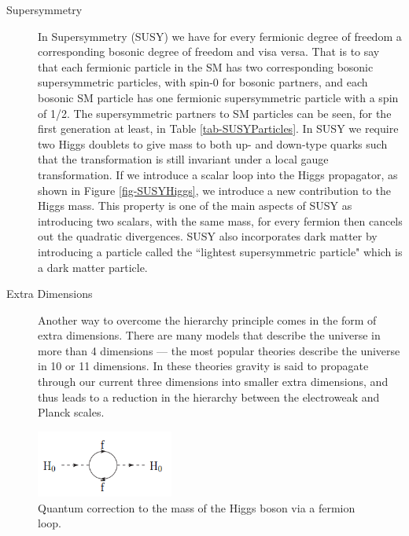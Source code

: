 \begin{description}
	\item[Supersymmetry] In Supersymmetry (SUSY) we have for every fermionic degree of freedom a corresponding bosonic degree of freedom and visa versa. That is to say that each fermionic particle in the SM has two corresponding bosonic supersymmetric particles, with spin-0 for bosonic partners, and each bosonic SM particle has one fermionic supersymmetric particle with a spin of 1/2. The supersymmetric partners to SM particles can be seen, for the first generation at least, in Table \ref{tab-SUSYParticles}. In SUSY we require two Higgs doublets to give mass to both up- and down-type quarks such that the transformation is still invariant under a local gauge transformation. If we introduce a scalar loop into the Higgs propagator, as shown in Figure \ref{fig-SUSYHiggs}, we introduce a new contribution to the Higgs mass. This property is one of the main aspects of SUSY as introducing two scalars, with the same mass, for every fermion then cancels out the quadratic divergences. SUSY also incorporates dark matter by introducing a particle called the ``lightest supersymmetric particle" which is a dark matter particle. 
	\item[Extra Dimensions] Another way to overcome the hierarchy principle comes in the form of extra dimensions. There are many models that describe the universe in more than 4 dimensions --- the most popular theories describe the universe in 10 or 11 dimensions. In these theories gravity is said to propagate through our current three dimensions into smaller extra dimensions, and thus leads to a reduction in the hierarchy between the electroweak and Planck scales.
\end{description}

\begin{figure}
\begin{center}
\includegraphics[width=0.4\textwidth]{Figures/HiggsCorrection.png}
\end{center}
\caption{Quantum correction to the mass of the Higgs boson via a fermion loop.}
\label{fig-HiggsCorrections}
\end{figure}


